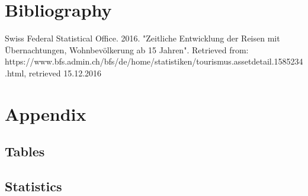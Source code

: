 \documentclass[12pt,a4paper,bibliography=totocnumbered,listof=totocnumbered]{scrartcl}
\begin{document}






%


%










\section{Bibliography}

Swiss Federal Statistical Office. 2016. "Zeitliche Entwicklung der Reisen mit Übernachtungen, Wohnbevölkerung ab 15 Jahren". Retrieved from: \\https://www.bfs.admin.ch/bfs/de/home/statistiken/tourismus.assetdetail.1585234.html, retrieved 15.12.2016



\section{Appendix}



\subsection{Tables}

\subsection{Statistics}
\end{document}
